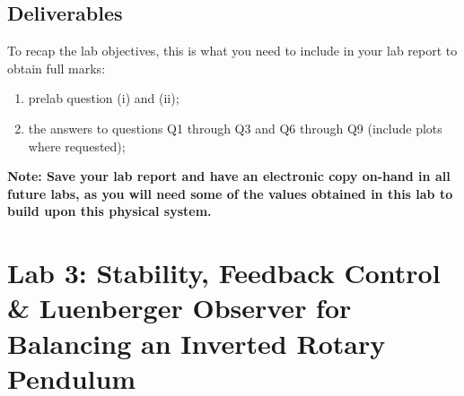 \documentclass[12pt]{report}
\begin{document}
\begin{enumerate}[Question]
\end{enumerate}

\subsection{Deliverables}
To recap the lab objectives, this is what you need to include in your lab report to obtain full marks:
\begin{enumerate}
    \item prelab question (i) and (ii);
    \item the answers to questions Q1 through Q3 and Q6 through Q9 (include plots where requested);
\end{enumerate}
\textbf{Note: Save your lab report and have an electronic copy on-hand in all future labs, as you will need some of the values obtained in this lab to build upon this physical system.}
\newpage
\section{Lab 3: Stability, Feedback Control \& Luenberger Observer for Balancing an Inverted Rotary Pendulum} \label{section:lab3}
\end{document}
